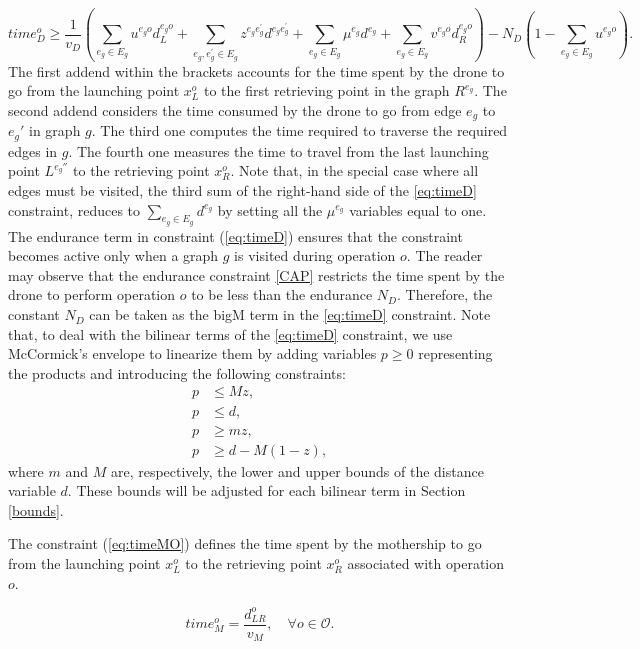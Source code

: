 \documentclass[10pt,a4paper]{elsarticle}
\newcommand{\EN}[1]{{\color{black}#1}}
\begin{document}
\begin{equation}\tag{Time$_D^o$}
time_D^o \geq \frac{1}{v_D}\left(\sum_{e_g\in E_g} u^{e_go}d_L^{e_go} + \sum_{e_g, e^\prime_g\in E_g}z^{e_ge^\prime_g}d^{e_ge^\prime_g} + \sum_{e_g\in E_g} \mu^{e_g}d^{e_g} + \sum_{e_g\in E_g} v^{e_go}d_R^{e_go}\right) - N_D(1 - \sum_{e_g\in E_g} u^{e_go}). 
\label{eq:timeD}
\end{equation}
\noindent
The first addend within the brackets accounts for the time spent by the drone to go from the launching point $x_L^o$ to the first retrieving point in the graph $R^{e_g}$. The second addend considers the time consumed by the drone to go from edge $e_g$ to $e_g'$ in graph $g$. The third one computes the time required \EN{to traverse} the required edges in $g$. The fourth one measures the time to travel from the last launching point $L^{e_g''}$ to the retrieving point $x_R^o$. Note that, in the special case where all edges must be visited, the third sum of the right-hand side of the \eqref{eq:timeD} constraint, reduces to $\sum_{e_g\in E_g} d^{e_g}$ by setting all the $\mu^{e_g}$ variables equal to one.
\noindent
The endurance term in constraint (\ref{eq:timeD}) ensures that the constraint becomes active only when a graph $g$ is visited during operation $o$. The reader may observe that the endurance constraint \eqref{CAP} restricts the time spent by the drone to perform operation $o$ to be less than the endurance $N_D$. Therefore, the constant $N_D$ can be taken as the bigM term in \EN{the} \eqref{eq:timeD} constraint.
\noindent
Note that, to deal with the bilinear terms of the \eqref{eq:timeD} constraint, we use McCormick's envelope to linearize them by adding variables $p\geq 0$  representing the products and introducing the following constraints:
\begin{align*}
p & \leq  M z, \\
p & \leq  d, \\
p & \geq m z, \\
p & \geq d - M(1 - z),
\end{align*}
where $m$ and $M$ are, respectively, the lower and upper bounds of the distance variable $d$. These bounds will be adjusted for each bilinear term in Section \ref{bounds}.

\noindent
\EN{The} constraint (\ref{eq:timeMO}) defines the time spent by the mothership to go from the launching point $x_L^o$ to the retrieving point $x_R^o$ associated with operation $o$.

\begin{equation}\tag{Time$_M^o$}
time_M^o = \frac{d_{LR}^o}{v_M}, \quad \forall o \in \mathcal O.
\label{eq:timeMO}
\end{equation}
\end{document}
